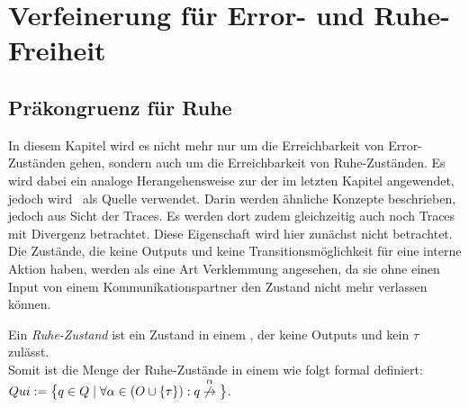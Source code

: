 \chapter{Verfeinerung für Error- und Ruhe-Freiheit}

\section{Präkongruenz für Ruhe}

In diesem Kapitel wird es nicht mehr nur um die Erreichbarkeit von
Error-Zuständen gehen, sondern auch um die Erreichbarkeit von
Ruhe-Zuständen. Es wird dabei ein analoge Herangehensweise zur der im letzten
Kapitel angewendet, jedoch wird~\cite{Chilton2013} als Quelle verwendet. Darin
werden ähnliche Konzepte beschrieben, jedoch aus Sicht der Traces. Es werden
dort zudem gleichzeitig auch noch Traces mit Divergenz betrachtet. Diese
Eigenschaft wird hier zunächst nicht betrachtet.\\
Die Zustände, die keine Outputs und keine Transitionsmöglichkeit für
eine interne Aktion haben, werden als eine Art Verklemmung angesehen, da sie
ohne einen Input von einem Kommunikationspartner den Zustand nicht mehr
verlassen können.

\begin{Def}[Ruhe]
  Ein \emph{Ruhe-Zustand} ist ein Zustand in einem \EIO{}, der keine
  Outputs und kein $\tau$ zulässt.\\
  Somit ist die Menge der Ruhe-Zustände in einem \EIO{} wie folgt formal
  definiert: $Qui:=\big\{q\in Q\mid \forall \alpha\in (O\cup \{\tau\}): q
  \overset{\alpha}{\not{\hspace{-0.1cm}\rightarrow}}\big\}$.
\end{Def}

